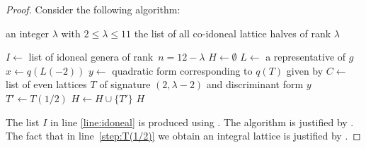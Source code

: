 \documentclass[a4paper]{amsart}
\newenvironment{myalgorithm}{\captionsetup{type=algType}}{}
\theoremstyle{definition}
\theoremstyle{plain}
\begin{document}
\begin{proof}
Consider the following algorithm:
    \begin{myalgorithm}\caption{Co-idoneal lattices}\label{alg:co-idoneal}
    \begin{algorithmic}[1]
         \REQUIRE an integer \(\lambda\) with \(2 \leq \lambda \leq 11\)
         \ENSURE the list of all co-idoneal lattice halves of rank \(\lambda\)

         \STATE \label{line:idoneal} \(I \longleftarrow\) list of idoneal genera of rank~\(n = 12-\lambda\)
         \STATE \(H \longleftarrow \emptyset\)
            \STATE \(L \longleftarrow\) a representative of \(g\)
            \STATE \label{line:x} \(x \longleftarrow q(L(-2))\)
                \STATE \label{line:y} \(y \longleftarrow\) quadratic form corresponding to \(q(T)\) given by 
                \STATE \label{line:C} \(C \longleftarrow\) list of even lattices \(T\) of signature \((2,\lambda -2)\) and discriminant form \(y\)
                    \STATE \(T' \longleftarrow T(1/2)\) \label{step:T(1/2)}
                    \STATE \(H \longleftarrow H \cup \{T'\}\)
                \ENDFOR
            \ENDIF
         \ENDFOR 
         \RETURN \(H\)
    \end{algorithmic}
    \end{myalgorithm}
    The list \(I\) in line \ref{line:idoneal} is produced using .
    The algorithm is justified by .  The fact that in line~\ref{step:T(1/2)} we obtain an integral lattice is justified by .
\end{proof}
\end{document}
